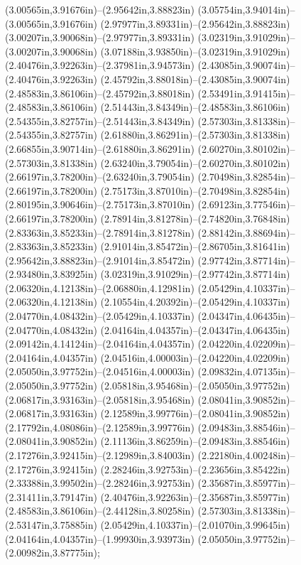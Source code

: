 (3.00565in,3.91676in)--(2.95642in,3.88823in) (3.05754in,3.94014in)--(3.00565in,3.91676in) (2.97977in,3.89331in)--(2.95642in,3.88823in) (3.00207in,3.90068in)--(2.97977in,3.89331in) (3.02319in,3.91029in)--(3.00207in,3.90068in) (3.07188in,3.93850in)--(3.02319in,3.91029in) (2.40476in,3.92263in)--(2.37981in,3.94573in) (2.43085in,3.90074in)--(2.40476in,3.92263in) (2.45792in,3.88018in)--(2.43085in,3.90074in) (2.48583in,3.86106in)--(2.45792in,3.88018in) (2.53491in,3.91415in)--(2.48583in,3.86106in) (2.51443in,3.84349in)--(2.48583in,3.86106in) (2.54355in,3.82757in)--(2.51443in,3.84349in) (2.57303in,3.81338in)--(2.54355in,3.82757in) (2.61880in,3.86291in)--(2.57303in,3.81338in) (2.66855in,3.90714in)--(2.61880in,3.86291in) (2.60270in,3.80102in)--(2.57303in,3.81338in) (2.63240in,3.79054in)--(2.60270in,3.80102in) (2.66197in,3.78200in)--(2.63240in,3.79054in) (2.70498in,3.82854in)--(2.66197in,3.78200in) (2.75173in,3.87010in)--(2.70498in,3.82854in) (2.80195in,3.90646in)--(2.75173in,3.87010in) (2.69123in,3.77546in)--(2.66197in,3.78200in) (2.78914in,3.81278in)--(2.74820in,3.76848in) (2.83363in,3.85233in)--(2.78914in,3.81278in) (2.88142in,3.88694in)--(2.83363in,3.85233in) (2.91014in,3.85472in)--(2.86705in,3.81641in) (2.95642in,3.88823in)--(2.91014in,3.85472in) (2.97742in,3.87714in)--(2.93480in,3.83925in) (3.02319in,3.91029in)--(2.97742in,3.87714in) (2.06320in,4.12138in)--(2.06880in,4.12981in) (2.05429in,4.10337in)--(2.06320in,4.12138in) (2.10554in,4.20392in)--(2.05429in,4.10337in) (2.04770in,4.08432in)--(2.05429in,4.10337in) (2.04347in,4.06435in)--(2.04770in,4.08432in) (2.04164in,4.04357in)--(2.04347in,4.06435in) (2.09142in,4.14124in)--(2.04164in,4.04357in) (2.04220in,4.02209in)--(2.04164in,4.04357in) (2.04516in,4.00003in)--(2.04220in,4.02209in) (2.05050in,3.97752in)--(2.04516in,4.00003in) (2.09832in,4.07135in)--(2.05050in,3.97752in) (2.05818in,3.95468in)--(2.05050in,3.97752in) (2.06817in,3.93163in)--(2.05818in,3.95468in) (2.08041in,3.90852in)--(2.06817in,3.93163in) (2.12589in,3.99776in)--(2.08041in,3.90852in) (2.17792in,4.08086in)--(2.12589in,3.99776in) (2.09483in,3.88546in)--(2.08041in,3.90852in) (2.11136in,3.86259in)--(2.09483in,3.88546in) (2.17276in,3.92415in)--(2.12989in,3.84003in) (2.22180in,4.00248in)--(2.17276in,3.92415in) (2.28246in,3.92753in)--(2.23656in,3.85422in) (2.33388in,3.99502in)--(2.28246in,3.92753in) (2.35687in,3.85977in)--(2.31411in,3.79147in) (2.40476in,3.92263in)--(2.35687in,3.85977in) (2.48583in,3.86106in)--(2.44128in,3.80258in) (2.57303in,3.81338in)--(2.53147in,3.75885in) (2.05429in,4.10337in)--(2.01070in,3.99645in) (2.04164in,4.04357in)--(1.99930in,3.93973in) (2.05050in,3.97752in)--(2.00982in,3.87775in);
